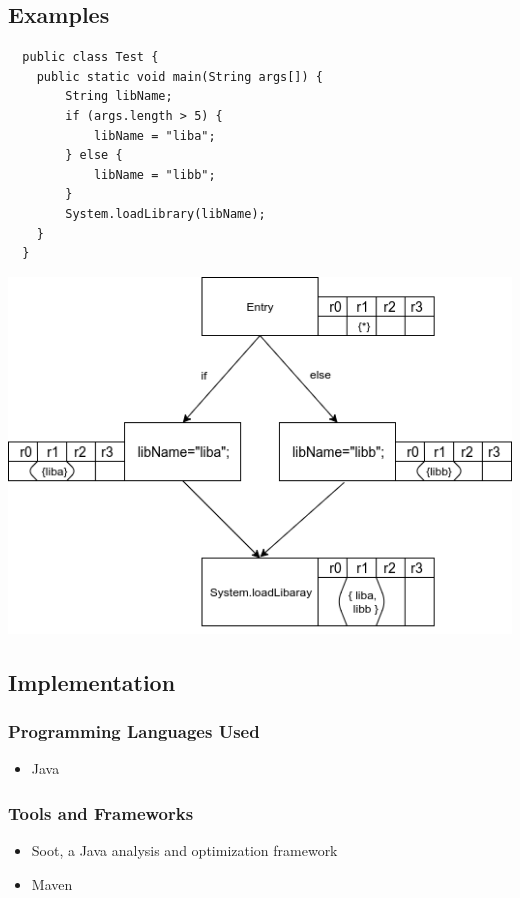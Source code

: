 \documentclass[12pt, portrait]{article}
\begin{document}
\begin{multicols}{2}
  \subsection*{Examples}
  \begin{lstlisting}
  public class Test {
    public static void main(String args[]) {
        String libName;
        if (args.length > 5) {
            libName = "liba";
        } else {
            libName = "libb";
        }
        System.loadLibrary(libName);
    }
  }
  \end{lstlisting}
  \includegraphics[width=\linewidth]{data_flow.png}

  \subsection*{Implementation}
    \subsubsection*{Programming Languages Used}
    {\color{secondary}
      \begin{itemize}
      \item Java
      \end{itemize}
    }
    \subsubsection*{Tools and Frameworks}
    {\color{secondary}
      \begin{itemize}
      \item Soot, a Java analysis and optimization framework
      \item Maven
      \end{itemize}
    }

\end{multicols}
\end{document}
